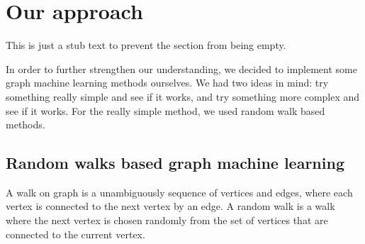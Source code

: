 \section{Our approach}
This is just a stub text to prevent the section from being empty.

In order to further strengthen our understanding, we decided to implement some graph machine learning methods ourselves.
We had two ideas in mind: try something really simple and see if it works, and try something more complex and see if it works.
For the really simple method, we used random walk based methods.

\subsection{Random walks based graph machine learning}

A walk on graph is a unambiguously sequence of vertices and edges, where each vertex is connected to the next vertex by an edge.
A random walk is a walk where the next vertex is chosen randomly from the set of vertices that are connected to the current vertex.
